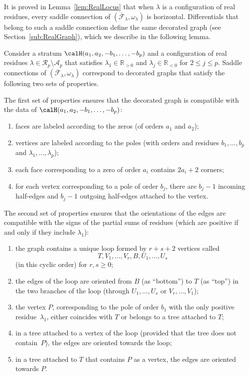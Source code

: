 It is proved in Lemma~\ref{lem:RealLocus} that when $\lambda$ is a configuration of real residues, every saddle connection of
$(\overline{\mathcal{F}}_{\lambda}, \omega_\lambda)$ is horizontal. Differentials that belong to such a saddle connection define the same decorated graph (see Section~\ref{sub:RealGraph}), which we describe in the following lemma.

\begin{lem}\label{lem:Sec8SaddleConnection}
Consider a stratum $\calH(a_{1},a_{2},-b_{1},\dots,-b_{p})$ and a configuration of real residues $\lambda\in \mathcal{R}_{p} \setminus \mathcal{A}_{p}$ that satisfies $\lambda_{1} \in \mathbb{R}_{>0}$ and $\lambda_{j} \in \mathbb{R}_{<0}$ for $2 \leq j \leq p$.
Saddle connections of $(\overline{\mathcal{F}}_{\lambda}, \omega_\lambda)$ correspond to decorated graphs that satisfy the following two sets of properties.

The first set of properties ensures that the decorated graph is compatible with the data of $\calH(a_{1},a_{2},-b_{1},\dots,-b_{p})$:
\begin{enumerate}
\item faces are labeled according to the zeros (of orders $a_{1}$ and $a_{2}$);
\item vertices are labeled according to the poles (with orders and residues $b_{1},\dots,b_{p}$ and $\lambda_{1},\dots,\lambda_{p}$);
\item each face corresponding to a zero of order $a_{i}$ contains $2a_{i}+2$ corners;
\item for each vertex corresponding to a pole of order $b_{j}$, there are $b_{j}-1$ incoming half-edges and $b_{j}-1$ outgoing half-edges attached to the vertex.
\end{enumerate}
The second set of properties ensures that the orientations of the edges are compatible with the signs of the partial sums of residues (which are positive if and only if they include $\lambda_{1}$):
\begin{enumerate}
\item the graph contains a unique loop formed by $r+s+2$ vertices called
\[
T,V_{1},\dots,V_{r},B,U_{1},\dots,U_{s}
\]
(in this cyclic order) for $r,s \geq 0$;
\item the edges of the loop are oriented from $B$ (as ``bottom'') to $T$ (as ``top'') in the two branches of the loop (through $U_{1},\dots,U_{s}$ or $V_{r},\dots,V_{1}$);
\item the vertex $P$, corresponding to the pole of order $b_{1}$ with the only positive residue~$\lambda_{1}$, either coincides with $T$ or belongs to a tree attached to $T$;
\item in a tree attached to a vertex of the loop (provided that the tree does not contain~$P$), the edges are oriented towards the loop;
\item in a tree attached to $T$ that contains $P$ as a vertex, the edges are oriented towards $P$.
\end{enumerate}


\end{lem}
